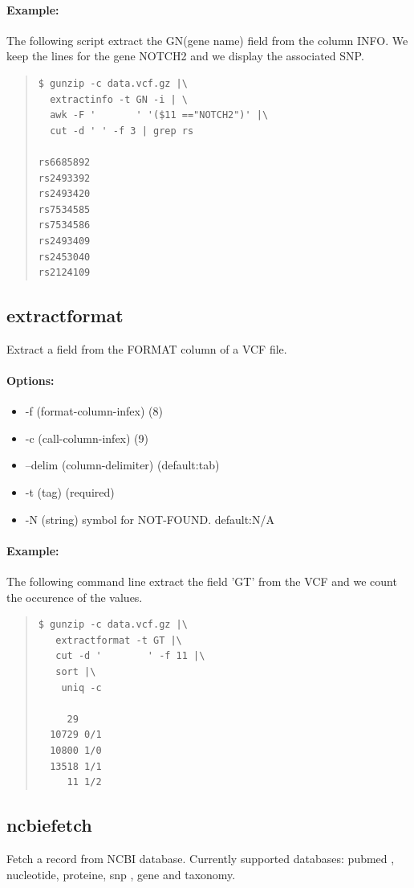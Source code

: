 \documentclass[12pt]{article}
\begin{document}
\paragraph{Example:}
The following script extract the GN(gene name) field from the column INFO. We keep the lines for the gene NOTCH2 and we display the associated SNP.
\begin{quote}
\begin{verbatim}
$ gunzip -c data.vcf.gz |\
  extractinfo -t GN -i | \
  awk -F '       ' '($11 =="NOTCH2")' |\
  cut -d ' ' -f 3 | grep rs

rs6685892
rs2493392
rs2493420
rs7534585
rs7534586
rs2493409
rs2453040
rs2124109

\end{verbatim}
\end{quote}

\subsection{extractformat}
Extract a field from the FORMAT column of a VCF file.
\paragraph{Options:}
\begin{itemize}
\item-f (format-column-infex) (8)
\item-c (call-column-infex) (9)
\item--delim (column-delimiter) (default:tab)
\item-t (tag) (required)
\item-N (string) symbol for NOT-FOUND. default:N/A
\end{itemize}
\paragraph{Example:}
The following command line extract the field 'GT' from the VCF and we count the occurence of the values.

\begin{quote}
\begin{verbatim}
$ gunzip -c data.vcf.gz |\
   extractformat -t GT |\
   cut -d '        ' -f 11 |\
   sort |\
    uniq -c

     29 
  10729 0/1
  10800 1/0
  13518 1/1
     11 1/2
\end{verbatim}
\end{quote}

\subsection{ncbiefetch}
Fetch a record from NCBI database.
Currently supported databases: pubmed , nucleotide, proteine, snp , gene and taxonomy.
\end{document}
